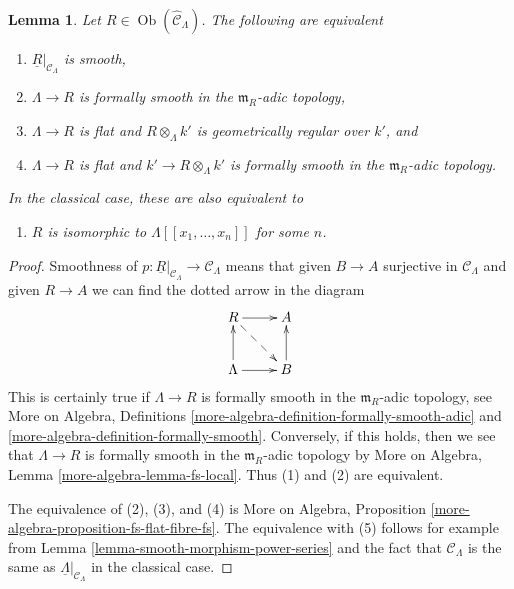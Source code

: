 \documentclass{stacks-project}
\theoremstyle{plain}
\newtheorem{lemma}[subsection]{Lemma}
\theoremstyle{definition}
\theoremstyle{remark}
\numberwithin{equation}{subsection}
\def\Ob{\mathop{\mathrm{Ob}}\nolimits}
\begin{document}
\begin{lemma}
\label{lemma-smooth}
Let $R \in \Ob(\widehat{\mathcal{C}}_\Lambda)$. The following are
equivalent
\begin{enumerate}
\item $\underline{R}|_{\mathcal{C}_\Lambda}$ is smooth,
\item $\Lambda \to R$ is formally smooth in the $\mathfrak m_R$-adic topology,
\item $\Lambda \to R$ is flat and $R \otimes_\Lambda k'$ is
geometrically regular over $k'$, and
\item $\Lambda \to R$ is flat and $k' \to R \otimes_\Lambda k'$ is
formally smooth in the $\mathfrak m_R$-adic topology.
\end{enumerate}
In the classical case, these are also equivalent to
\begin{enumerate}
\item[(5)] $R$ is isomorphic to $\Lambda[[x_1, \ldots, x_n]]$
for some $n$.
\end{enumerate}
\end{lemma}

\begin{proof}
Smoothness of
$p : \underline{R}|_{\mathcal{C}_\Lambda} \to \mathcal{C}_\Lambda$
means that given $B \to A$ surjective in $\mathcal{C}_\Lambda$
and given $R \to A$ we can find the dotted arrow in the
diagram
$$
\xymatrix{
R \ar[r] \ar@{-->}[rd] & A \\
\Lambda \ar[r] \ar[u] & B \ar[u]
}
$$
This is certainly true if $\Lambda \to R$ is formally smooth in the
$\mathfrak m_R$-adic topology, see
More on Algebra, Definitions
\ref{more-algebra-definition-formally-smooth-adic} and
\ref{more-algebra-definition-formally-smooth}.
Conversely, if this holds, then we see that
$\Lambda \to R$ is formally smooth in the $\mathfrak m_R$-adic
topology by More on Algebra, Lemma \ref{more-algebra-lemma-fs-local}.
Thus (1) and (2) are equivalent.

\medskip\noindent
The equivalence of (2), (3), and (4) is
More on Algebra, Proposition \ref{more-algebra-proposition-fs-flat-fibre-fs}.
The equivalence with (5) follows for example from
Lemma \ref{lemma-smooth-morphism-power-series}
and the fact that $\mathcal{C}_\Lambda$ is the same
as $\underline{\Lambda}|_{\mathcal{C}_\Lambda}$ in the classical case.
\end{proof}
\end{document}
